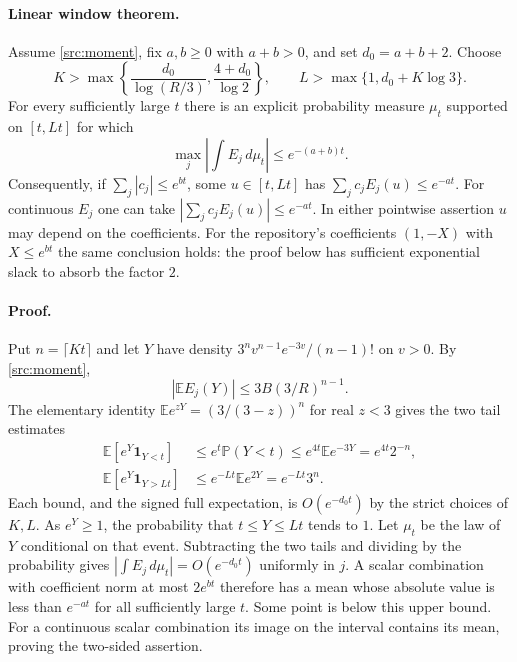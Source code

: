 \paragraph{Linear window theorem.}
Assume \eqref{src:moment}, fix $a,b\ge0$ with $a+b>0$, and set $d_0=a+b+2$. Choose
\[
 K>\max\left\{\frac{d_0}{\log(R/3)},\frac{4+d_0}{\log 2}\right\},
 \qquad L>\max\{1,d_0+K\log 3\}.
\]
For every sufficiently large $t$ there is an explicit probability measure $\mu_t$ supported on $[t,Lt]$ for which
\[
 \max_j\left|\int E_j\,d\mu_t\right|\le e^{-(a+b)t}.
\]
Consequently, if $\sum_j |c_j|\le e^{bt}$, some $u\in[t,Lt]$ has
$\sum_j c_j E_j(u)\le e^{-at}$. For continuous $E_j$ one can take
$|\sum_j c_j E_j(u)|\le e^{-at}$. In either pointwise assertion $u$ may depend on the coefficients. For the repository's coefficients $(1,-X)$ with $X\le e^{bt}$ the same conclusion holds: the proof below has sufficient exponential slack to absorb the factor $2$.

\paragraph{Proof.}
Put $n=\lceil Kt\rceil$ and let $Y$ have density
$3^n v^{n-1}e^{-3v}/(n-1)!$ on $v>0$. By \eqref{src:moment},
\[
 |\mathbb E E_j(Y)|\le 3B(3/R)^{n-1}.
\]
The elementary identity $\mathbb E e^{zY}=(3/(3-z))^n$ for real $z<3$ gives the two tail estimates
\[
 \begin{split}
 \mathbb E[e^Y\mathbf1_{Y<t}]
 &\le e^t\mathbb P(Y<t)\le e^{4t}\mathbb E e^{-3Y}
 =e^{4t}2^{-n},\\
 \mathbb E[e^Y\mathbf1_{Y>Lt}]
 &\le e^{-Lt}\mathbb E e^{2Y}=e^{-Lt}3^n .
 \end{split}
\]
Each bound, and the signed full expectation, is $O(e^{-d_0t})$ by the strict choices of $K,L$. As $e^Y\ge1$, the probability that $t\le Y\le Lt$ tends to $1$. Let $\mu_t$ be the law of $Y$ conditional on that event. Subtracting the two tails and dividing by the probability gives $|\int E_j\,d\mu_t|=O(e^{-d_0t})$ uniformly in $j$. A scalar combination with coefficient norm at most $2e^{bt}$ therefore has a mean whose absolute value is less than $e^{-at}$ for all sufficiently large $t$. Some point is below this upper bound. For a continuous scalar combination its image on the interval contains its mean, proving the two-sided assertion.

